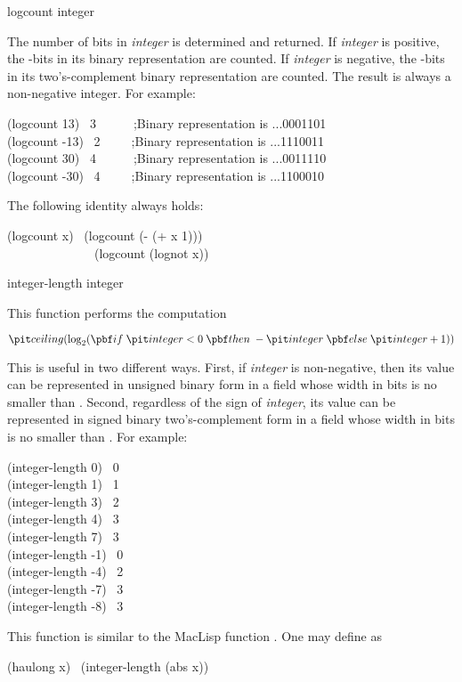 \begin{defun}[Function]
logcount integer

The number of bits in {\it integer} is determined and returned.
If {\it integer} is positive, the -bits in its binary
representation are counted.  If {\it integer} is negative,
the -bits in its two's-complement binary representation are counted.
The result is always a non-negative integer.
For example:
\begin{lisp}
(logcount 13) \EV\ 3~~~~~~;{\rm Binary representation is} ...0001101 \\
(logcount -13) \EV\ 2~~~~~;{\rm Binary representation is} ...1110011 \\
(logcount 30) \EV\ 4~~~~~~;{\rm Binary representation is} ...0011110 \\
(logcount -30) \EV\ 4~~~~~;{\rm Binary representation is} ...1100010
\end{lisp}
The following identity always holds:
\begin{lisp}
(logcount x) \EQ\ (logcount (- (+ x 1))) \\
~~~~~~~~~~~~~\EQ\ (logcount (lognot x))
\end{lisp}
\end{defun}

\begin{defun}[Function]
integer-length integer

This function performs the computation
\begin{tabbing}
\( {\it ceiling}(\log_2 ({\bf if}\; {\it integer} < 0 \;{\bf then} \;
    -{\it integer} \;{\bf else}\; {\it integer}+1)) \)
\end{tabbing}
This is useful in two different ways.
First, if {\it integer} is non-negative, then its value can be represented
in unsigned binary form in a field whose width in bits is
no smaller than .
Second, regardless of the sign of {\it integer}, its value can be
represented in signed binary two's-complement form in a field
whose width in bits is no smaller than .
For example:
\begin{lisp}
(integer-length 0) \EV\ 0 \\
(integer-length 1) \EV\ 1 \\
(integer-length 3) \EV\ 2 \\
(integer-length 4) \EV\ 3 \\
(integer-length 7) \EV\ 3 \\
(integer-length -1) \EV\ 0 \\
(integer-length -4) \EV\ 2 \\
(integer-length -7) \EV\ 3 \\
(integer-length -8) \EV\ 3
\end{lisp}

\beforenoterule
\begin{incompatibility}
This function is similar to the MacLisp
function .  One may define  as
\begin{lisp}
(haulong x) \EQ\ (integer-length (abs x))
\end{lisp}
\end{incompatibility}
\afternoterule
\end{defun}


